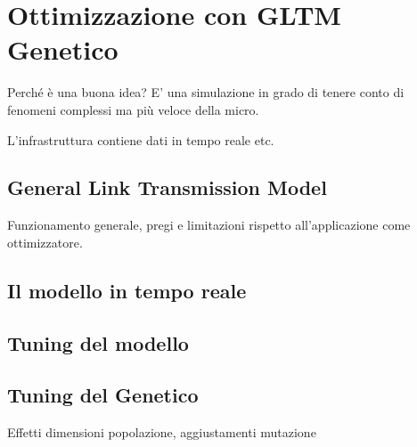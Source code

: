 \chapter{Ottimizzazione con GLTM Genetico}
Perché è una buona idea?
E' una simulazione in grado di tenere conto di fenomeni complessi ma più veloce della micro.

L'infrastruttura contiene dati in tempo reale etc.

\section{General Link Transmission Model}
Funzionamento generale, pregi e limitazioni rispetto all'applicazione come ottimizzatore.


\section{Il modello in tempo reale}

\section{Tuning del modello}


\section{Tuning del Genetico}
Effetti dimensioni popolazione, aggiustamenti mutazione
